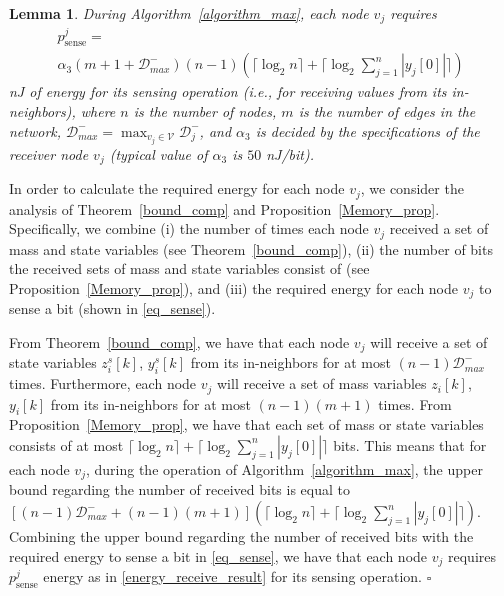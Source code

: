 \documentclass[twocolumn]{autart}    %
\newtheorem{lemma}{\bfseries Lemma}
\begin{document}
\begin{lemma}\label{energy_receive}
During Algorithm~\ref{algorithm_max}, each node $v_j$ requires 
\begin{align}
& p^j_{\text{sense}} = & \nonumber \\ 
& \alpha_3 (m + 1 + \mathcal{D}_{max}^-) (n-1) (\lceil \log_{2} n \rceil + \lceil \log_{2} \sum_{j=1}^n | y_j[0] | \rceil) & \label{energy_receive_result}
\end{align}
nJ of energy for its sensing operation (i.e., for receiving values from its in-neighbors), where $n$ is the number of nodes, $m$ is the number of edges in the network, $\mathcal{D}_{max}^- = \max_{v_j \in \mathcal{V}} \mathcal{D}_j^-$, and $\alpha_3$ is decided by the specifications of the receiver node $v_j$ (typical value of $\alpha_3$ is $50$ nJ/bit). 
\end{lemma}

\begin{pf}
In order to calculate the required energy for each node $v_j$, we consider the analysis of Theorem~\ref{bound_comp} and Proposition~\ref{Memory_prop}. 
Specifically, we combine (i) the number of times each node $v_j$ received a set of mass and state variables (see Theorem~\ref{bound_comp}), (ii)  the number of bits the received sets of mass and state variables consist of (see Proposition~\ref{Memory_prop}), and (iii) the required energy for each node $v_j$ to sense a bit (shown in \eqref{eq_sense}). 

From Theorem~\ref{bound_comp}, we have that each node $v_j$ will receive a set of state variables $z^s_i[k]$, $y^s_i[k]$ from its in-neighbors for at most $(n-1)\mathcal{D}_{max}^-$ times. 
Furthermore, each node $v_j$ will receive a set of mass variables $z_i[k]$, $y_i[k]$ from its in-neighbors for at most $(n-1)(m+1)$ times. 
From Proposition~\ref{Memory_prop}, we have that each set of mass or state variables consists of at most $\lceil \log_{2} n \rceil + \lceil \log_{2} \sum_{j=1}^n | y_j[0] | \rceil$ bits. 
This means that for each node $v_j$, during the operation of Algorithm~\ref{algorithm_max}, the upper bound regarding the number of received bits is equal to $[(n-1)\mathcal{D}_{max}^- + (n-1)(m+1)] (\lceil \log_{2} n \rceil + \lceil \log_{2} \sum_{j=1}^n | y_j[0] | \rceil)$. 
Combining the upper bound regarding the number of received bits with the required energy to sense a bit in \eqref{eq_sense}, we have that each node $v_j$ requires $p^j_{\text{sense}}$ energy as in \eqref{energy_receive_result} for its sensing operation. \hspace*{\fill} $\square$
\end{pf}
\end{document}
